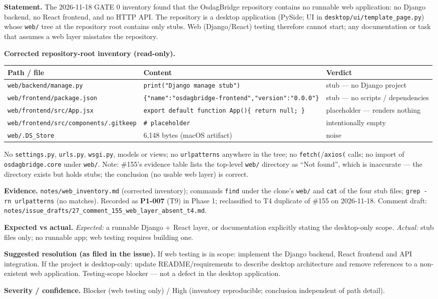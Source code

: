 \textbf{Statement.} The 2026-11-18 GATE 0 inventory found that the OsdagBridge repository contains no runnable web application: no Django backend, no React frontend, and no HTTP API. The repository is a desktop application (PySide; UI in \texttt{desktop/ui/template\_page.py}) whose \texttt{web/} tree at the repository root contains only stubs. Web (Django/React) testing therefore cannot start; any documentation or task that assumes a web layer misstates the repository.

\textbf{Corrected repository-root inventory (read-only).}

\begin{longtable}{@{}p{5.2cm}p{5.6cm}p{4.2cm}@{}}
\toprule
Path / file & Content & Verdict \\
\midrule
\texttt{web/backend/manage.py} & \texttt{print("Django manage stub")} & stub --- no Django project \\
\texttt{web/frontend/package.json} & \texttt{\{"name":"osdagbridge-frontend","version":"0.0.0"\}} & stub --- no scripts / dependencies \\
\texttt{web/frontend/src/App.jsx} & \texttt{export default function App()\{ return null; \}} & placeholder --- renders nothing \\
\texttt{web/frontend/src/components/.gitkeep} & \texttt{\# placeholder} & intentionally empty \\
\texttt{web/.DS\_Store} & 6,148 bytes (macOS artifact) & noise \\
\bottomrule
\end{longtable}

No \texttt{settings.py}, \texttt{urls.py}, \texttt{wsgi.py}, models or views; no \texttt{urlpatterns} anywhere in the tree; no \texttt{fetch(}/\texttt{axios(} calls; no import of \texttt{osdagbridge.core} under \texttt{web/}. Note: \#155's evidence table lists the top-level \texttt{web/} directory as ``Not found'', which is inaccurate --- the directory exists but holds stubs; the conclusion (no usable web layer) is correct.

\textbf{Evidence.} \texttt{notes/web\_inventory.md} (corrected inventory); commands \texttt{find} under the clone's \texttt{web/} and \texttt{cat} of the four stub files; \texttt{grep -rn urlpatterns} (no matches). Recorded as \textbf{P1-007} (T9) in Phase 1; reclassified to T4 duplicate of \#155 on 2026-11-18. Comment draft: \texttt{notes/issue\_drafts/27\_comment\_155\_web\_layer\_absent\_t4.md}.

\textbf{Expected vs actual.} \emph{Expected:} a runnable Django + React layer, or documentation explicitly stating the desktop-only scope. \emph{Actual:} stub files only; no runnable app; web testing requires building one.

\textbf{Suggested resolution (as filed in the issue).} If web testing is in scope: implement the Django backend, React frontend and API integration. If the project is desktop-only: update README/requirements to describe desktop architecture and remove references to a non-existent web application. Testing-scope blocker --- not a defect in the desktop application.

\textbf{Severity / confidence.} Blocker (web testing only) / High (inventory reproducible; conclusion independent of path detail).
